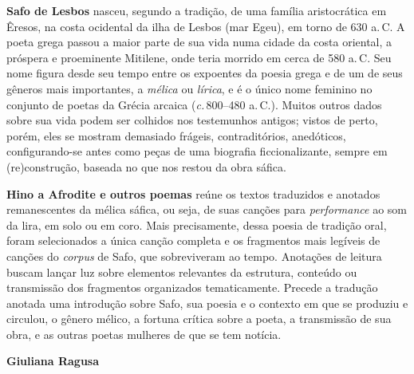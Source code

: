 \textbf{Safo de Lesbos} nasceu, segundo a tradição, de uma família aristocrática em Êresos, na costa ocidental da ilha de Lesbos (mar Egeu), em torno de 630 a.\,C. A poeta grega passou a maior parte de sua vida numa cidade da costa oriental, a próspera e proeminente Mitilene, onde teria morrido em cerca de 580 a.\,C. Seu nome figura desde seu tempo entre os expoentes da poesia grega e de um de seus gêneros mais importantes, a \emph{mélica} ou \emph{lírica}, e é o único nome feminino no conjunto de poetas da Grécia arcaica (\emph{c.}\,800--480 a.\,C.). Muitos outros dados sobre sua vida podem ser colhidos nos testemunhos antigos; vistos de perto, porém, eles se mostram demasiado frágeis, contraditórios, anedóticos, configurando-se antes como peças de uma biografia ficcionalizante, sempre em (re)construção, baseada no que nos restou da obra sáfica.

\textbf{Hino a Afrodite e outros poemas} reúne os textos traduzidos e anotados remanescentes da mélica sáfica, ou seja, de suas canções para \emph{performance} ao som da lira, em solo ou em coro. Mais precisamente, dessa poesia de tradição oral, foram selecionados a única canção completa e os fragmentos mais legíveis de canções do \emph{corpus} de Safo, que sobreviveram ao tempo. Anotações de leitura buscam lançar luz sobre elementos relevantes da estrutura, conteúdo ou transmissão dos fragmentos organizados tematicamente. Precede a tradução anotada uma introdução sobre Safo, sua poesia e o contexto em que se produziu e circulou, o gênero mélico, a fortuna crítica sobre a poeta, a transmissão de sua obra, e as outras poetas mulheres de que se tem notícia.

\textbf{Giuliana Ragusa} 




